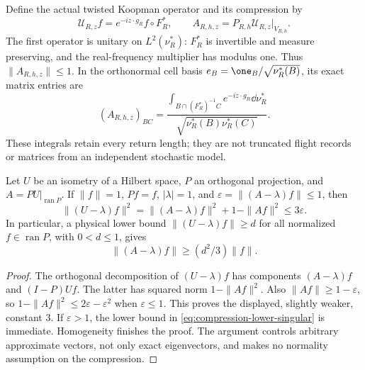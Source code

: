 Define the actual twisted Koopman operator and its compression by
\begin{equation}\label{eq:actual-compressed-operator}
 \mathcal U_{R,z}f=e^{-iz\cdot g_R}f\circ F_R^*,\qquad
 A_{R,h,z}=P_{R,h}\mathcal U_{R,z}|_{V_{R,h}}.
\end{equation}
The first operator is unitary on $L^2(\nu_R^*)$: $F_R^*$ is invertible
and measure preserving, and the real-frequency multiplier has modulus
one. Thus $\|A_{R,h,z}\|\le1$. In the orthonormal cell basis
$e_B=\one_B/\sqrt{\nu_R^*(B)}$, its exact matrix entries are
\begin{equation}\label{eq:actual-compressed-matrix}
 (A_{R,h,z})_{BC}=
 \frac{\displaystyle\int_{B\cap(F_R^*)^{-1}C}
                         e^{-iz\cdot g_R}\dd\nu_R^*}
      {\sqrt{\nu_R^*(B)\nu_R^*(C)}}.
\end{equation}
These integrals retain every return length; they are not truncated
flight records or matrices from an independent stochastic model.

\begin{lemma}
\label{lem:compression-defect-comparison}
Let $U$ be an isometry of a Hilbert space, $P$ an orthogonal projection,
and $A=PU|_{\operatorname{ran}P}$. If $\|f\|=1$, $Pf=f$,
$|\lambda|=1$, and $\varepsilon=\|(A-\lambda)f\|\le1$, then
\begin{equation}\label{eq:compression-defect-comparison}
 \|(U-\lambda)f\|^2
   =\|(A-\lambda)f\|^2+1-\|Af\|^2
   \le3\varepsilon.
\end{equation}
In particular, a physical lower bound
$\|(U-\lambda)f\|\ge d$ for all normalized $f\in\operatorname{ran}P$,
with $0<d\le1$, gives
\begin{equation}\label{eq:compression-lower-singular}
 \|(A-\lambda)f\|\ge(d^2/3)\|f\|.
\end{equation}
\end{lemma}
\begin{proof}
The orthogonal decomposition of $(U-\lambda)f$ has components
$(A-\lambda)f$ and $(I-P)Uf$. The latter has squared norm
$1-\|Af\|^2$. Also $\|Af\|\ge1-\varepsilon$, so
$1-\|Af\|^2\le2\varepsilon-\varepsilon^2$ when
$\varepsilon\le1$. This proves the displayed, slightly weaker,
constant $3$. If $\varepsilon>1$, the lower bound in
\eqref{eq:compression-lower-singular} is immediate. Homogeneity
finishes the proof. The argument controls arbitrary approximate
vectors, not only exact eigenvectors, and makes no normality assumption
on the compression.
\end{proof}

